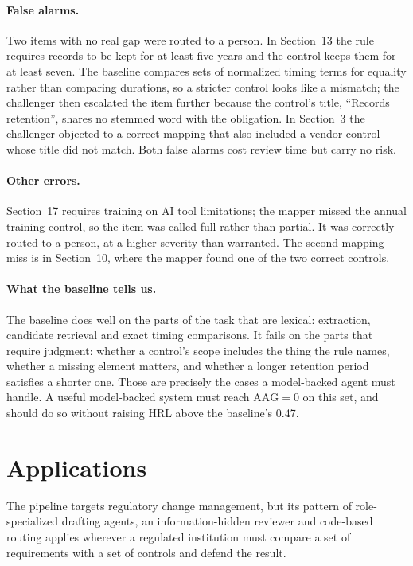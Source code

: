 \documentclass[sigconf,review,anonymous]{acmart}
\newcommand{\gappartial}{\textsf{partial}}
\newcommand{\gapfull}{\textsf{full}}
\begin{document}
\paragraph{False alarms.}
Two items with no real gap were routed to a person. In Section~13 the rule
requires records to be kept for at least five years and the control keeps
them for at least seven. The baseline compares sets of normalized timing
terms for equality rather than comparing durations, so a stricter control
looks like a mismatch; the challenger then escalated the item further
because the control's title, ``Records retention'', shares no stemmed word
with the obligation. In Section~3 the challenger objected to a correct
mapping that also included a vendor control whose title did not match. Both
false alarms cost review time but carry no risk.

\paragraph{Other errors.}
Section~17 requires training on AI tool limitations; the mapper missed the
annual training control, so the item was called \gapfull{} rather than
\gappartial{}. It was correctly routed to a person, at a higher severity
than warranted. The second mapping miss is in Section~10, where the mapper
found one of the two correct controls.

\paragraph{What the baseline tells us.}
The baseline does well on the parts of the task that are lexical:
extraction, candidate retrieval and exact timing comparisons. It fails on
the parts that require judgment: whether a control's scope includes the
thing the rule names, whether a missing element matters, and whether a
longer retention period satisfies a shorter one. Those are precisely the
cases a model-backed agent must handle. A useful model-backed system must
reach $\mathrm{AAG}=0$ on this set, and should do so without raising HRL
above the baseline's 0.47.

\section{Applications}
\label{sec:applications}

The pipeline targets regulatory change management, but its pattern of
role-specialized drafting agents, an information-hidden reviewer and
code-based routing applies wherever a regulated institution must compare a
set of requirements with a set of controls and defend the result.
\end{document}
